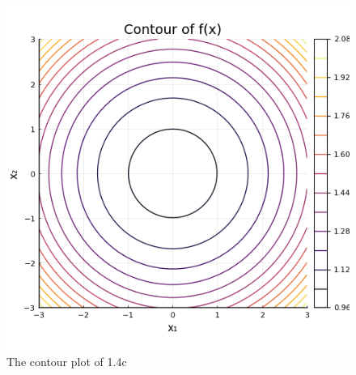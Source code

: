 \documentclass{article}
\begin{document}
\begin{figure}[H]
	\centering
	\includegraphics{plots/1_4c_contour.png}
	\caption{The contour plot of 1.4c}
	\label{fig:1.4c}
\end{figure}
\end{document}
